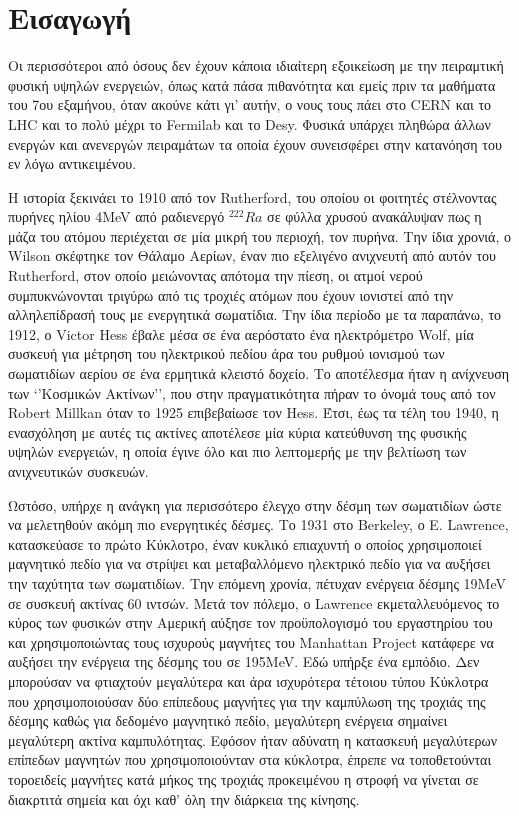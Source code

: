 \chapter{Εισαγωγή}

Οι περισσότεροι από όσους δεν έχουν κάποια ιδιαίτερη εξοικείωση με την πειραμτική φυσική υψηλών ενεργειών, όπως κατά πάσα πιθανότητα και εμείς πριν τα μαθήματα του 7ου εξαμήνου, όταν ακούνε κάτι γι’ αυτήν, ο νους τους πάει στο CERN και το LHC και το πολύ μέχρι το Fermilab και το Desy. Φυσικά υπάρχει πληθώρα άλλων ενεργών και ανενεργών πειραμάτων τα οποία έχουν συνεισφέρει στην κατανόηση του εν λόγω αντικειμένου.

Η ιστορία ξεκινάει το 1910 από τον Rutherford, του οποίου οι φοιτητές στέλνοντας πυρήνες ηλίου 4MeV από ραδιενεργό $^{222}Ra$ σε φύλλα χρυσού ανακάλυψαν πως η μάζα του ατόμου περιέχεται σε μία μικρή του περιοχή, τον πυρήνα. Την ίδια χρονιά, ο Wilson σκέφτηκε τον Θάλαμο Αερίων, έναν πιο εξελιγένο ανιχνευτή από αυτόν του Rutherford, στον οποίο μειώνοντας απότομα την πίεση, οι ατμοί νερού συμπυκνώνονται τριγύρω από τις τροχιές ατόμων που έχουν ιονιστεί από την αλληλεπίδρασή τους με ενεργητικά σωματίδια. Την ίδια περίοδο με τα παραπάνω, το 1912, ο Victor Hess έβαλε μέσα σε ένα αερόστατο ένα ηλεκτρόμετρο Wolf, μία συσκευή για μέτρηση του ηλεκτρικού πεδίου άρα του ρυθμού ιονισμού των σωματιδίων αερίου σε ένα ερμητικά κλειστό δοχείο. Το αποτέλεσμα ήταν η ανίχνευση των ‘’Κοσμικών Ακτίνων’’, που στην πραγματικότητα πήραν το όνομά τους από τον Robert Millkan όταν το 1925 επιβεβαίωσε τον Hess. Έτσι, έως τα τέλη του 1940, η ενασχόληση με αυτές τις ακτίνες αποτέλεσε μία κύρια κατεύθυνση της φυσικής υψηλών ενεργειών, η οποία έγινε όλο και πιο λεπτομερής με την βελτίωση των ανιχνευτικών συσκευών.
 
Ωστόσο, υπήρχε η ανάγκη για περισσότερο έλεγχο στην δέσμη των σωματιδίων ώστε να μελετηθούν ακόμη πιο ενεργητικές δέσμες. Το 1931 στο Berkeley, ο E. Lawrence, κατασκεύασε το πρώτο Κύκλοτρο, έναν κυκλικό επιαχυντή ο οποίος χρησιμοποιεί μαγνητικό πεδίο για να στρίψει και μεταβαλλόμενο ηλεκτρικό πεδίο για να αυξήσει την ταχύτητα των σωματιδίων. Την επόμενη χρονία, πέτυχαν ενέργεια δέσμης 19MeV σε συσκευή ακτίνας 60 ιντσών. Μετά τον πόλεμο, ο Lawrence εκμεταλλευόμενος το κύρος των φυσικών στην Αμερική αύξησε τον προϋπολογισμό του εργαστηρίου του και χρησιμοποιώντας τους ισχυρούς μαγνήτες του Manhattan Project κατάφερε να αυξήσει την ενέργεια της δέσμης του σε 195MeV. Εδώ υπήρξε ένα εμπόδιο. Δεν μπορούσαν να φτιαχτούν μεγαλύτερα και άρα ισχυρότερα τέτοιου τύπου Κύκλοτρα που χρησιμοποιούσαν δύο επίπεδους μαγνήτες για την καμπύλωση της τροχιάς της δέσμης καθώς για δεδομένο μαγνητικό πεδίο, μεγαλύτερη ενέργεια σημαίνει μεγαλύτερη ακτίνα καμπυλότητας. Εφόσον ήταν αδύνατη η κατασκευή μεγαλύτερων επίπεδων μαγνητών που χρησιμοποιούνταν στα κύκλοτρα, έπρεπε να τοποθετούνται τοροειδείς μαγνήτες  κατά μήκος της τροχιάς προκειμένου η στροφή να γίνεται σε διακρτιτά σημεία και όχι καθ’ όλη την διάρκεια της κίνησης. 


